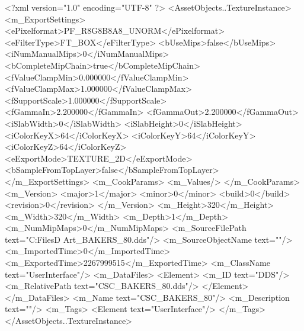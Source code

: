 <?xml version="1.0" encoding="UTF-8" ?>
<AssetObjects..TextureInstance>
	<m_ExportSettings>
		<ePixelformat>PF_R8G8B8A8_UNORM</ePixelformat>
		<eFilterType>FT_BOX</eFilterType>
		<bUseMips>false</bUseMips>
		<iNumManualMips>0</iNumManualMips>
		<bCompleteMipChain>true</bCompleteMipChain>
		<fValueClampMin>0.000000</fValueClampMin>
		<fValueClampMax>1.000000</fValueClampMax>
		<fSupportScale>1.000000</fSupportScale>
		<fGammaIn>2.200000</fGammaIn>
		<fGammaOut>2.200000</fGammaOut>
		<iSlabWidth>0</iSlabWidth>
		<iSlabHeight>0</iSlabHeight>
		<iColorKeyX>64</iColorKeyX>
		<iColorKeyY>64</iColorKeyY>
		<iColorKeyZ>64</iColorKeyZ>
		<eExportMode>TEXTURE_2D</eExportMode>
		<bSampleFromTopLayer>false</bSampleFromTopLayer>
	</m_ExportSettings>
	<m_CookParams>
		<m_Values/>
	</m_CookParams>
	<m_Version>
		<major>1</major>
		<minor>0</minor>
		<build>0</build>
		<revision>0</revision>
	</m_Version>
	<m_Height>320</m_Height>
	<m_Width>320</m_Width>
	<m_Depth>1</m_Depth>
	<m_NumMipMaps>0</m_NumMipMaps>
	<m_SourceFilePath text="C:\Users\Shadow\Desktop\Working Files\2D Art\Quarters\Bakers\CSC_BAKERS_80.dds"/>
	<m_SourceObjectName text=""/>
	<m_ImportedTime>0</m_ImportedTime>
	<m_ExportedTime>2267999515</m_ExportedTime>
	<m_ClassName text="UserInterface"/>
	<m_DataFiles>
		<Element>
			<m_ID text="DDS"/>
			<m_RelativePath text="CSC_BAKERS_80.dds"/>
		</Element>
	</m_DataFiles>
	<m_Name text="CSC_BAKERS_80"/>
	<m_Description text=""/>
	<m_Tags>
		<Element text="UserInterface"/>
	</m_Tags>
</AssetObjects..TextureInstance>

